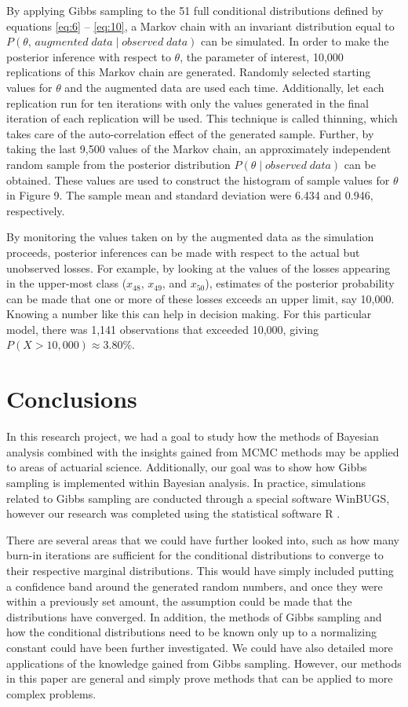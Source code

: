 \documentclass[11pt, oneside]{article}
\begin{document}
By applying Gibbs sampling to the 51 full conditional distributions defined by equations \ref{eq:6} -- \ref{eq:10}, a Markov chain with an invariant distribution equal to $P(\theta,\,augmented\;data\mid observed\;data)$ can be simulated. In order to make the posterior inference with respect to $\theta$, the parameter of interest, 10,000 replications of this Markov chain are generated. Randomly selected starting values for $\theta$ and the augmented data are used each time. Additionally, let each replication run for ten iterations with only the values generated in the final iteration of each replication will be used. This technique is called thinning, which takes care of the auto-correlation effect of the generated sample. Further, by taking the last 9,500 values of the Markov chain, an approximately independent random sample from the posterior distribution $P(\theta\mid observed\;data)$ can be obtained. These values are used to construct the histogram of sample values for $\theta$ in Figure 9. The sample mean and standard deviation were 6.434 and 0.946, respectively.

By monitoring the values taken on by the augmented data as the simulation proceeds, posterior inferences can be made with respect to the actual but unobserved losses. For example, by looking at the values of the losses appearing in the upper-most class ($x_{48}$, $x_{49}$, and $x_{50}$), estimates of the posterior probability can be made that one or more of these losses exceeds an upper limit, say 10,000. Knowing a number like this can help in decision making. For this particular model, there was 1,141 observations that exceeded 10,000, giving $P(X > 10,000) \approx 3.80\%$. 

\section{Conclusions}

In this research project, we had a goal to study how the methods of Bayesian analysis combined with the insights gained from MCMC methods may be applied to areas of actuarial science. Additionally, our goal was to show how Gibbs sampling is implemented within Bayesian analysis. In practice, simulations related to Gibbs sampling are conducted through a special software WinBUGS, however our research was completed using the statistical software R \cite{R}.

There are several areas that we could have further looked into, such as how many burn-in iterations are sufficient for the conditional distributions to converge to their respective marginal distributions. This would have simply included putting a confidence band around the generated random numbers, and once they were within a previously set amount, the assumption could be made that the distributions have converged. In addition, the methods of Gibbs sampling and how the conditional distributions need to be known only up to a normalizing constant could have been further investigated. We could have also detailed more applications of the knowledge gained from Gibbs sampling. However, our methods in this paper are general and simply prove methods that can be applied to more complex problems.
\end{document}

